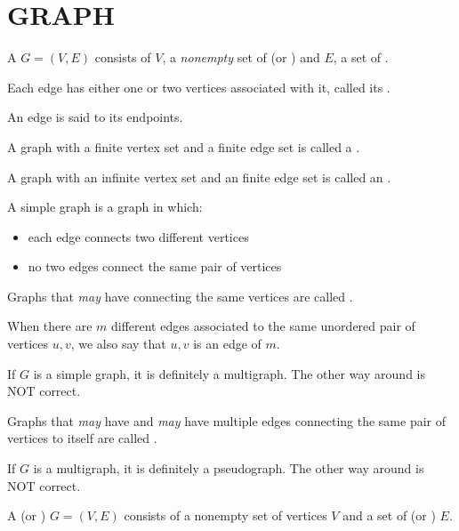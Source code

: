 \chapter{GRAPH}
        \par A  $G = (V, E)$ consists of $V$, a \textit{nonempty} set of
         (or ) and $E$, a set of .
        \par Each edge has either one or two vertices associated with it, called its
        .
        \par An edge is said to  its endpoints.
        \par A graph with a finite vertex set and a finite edge set is called a .
        \par A graph with an infinite vertex set and an finite edge set is called an
        .
        \par A simple graph is a graph in which:
        \begin{itemize}
            \item each edge connects two different vertices
            \item no two edges connect the same pair of vertices
        \end{itemize}
        \par Graphs that \textit{may} have  connecting the same vertices are
        called .
        \par When there are $m$ different edges associated to the same unordered pair of vertices
        ${u, v}$, we also say that ${u, v}$ is an edge of  $m$.
        \par If $G$ is a simple graph, it is definitely a multigraph. The other way around is NOT
        correct.
        \par Graphs that \textit{may} have  and \textit{may} have multiple edges
        connecting the same pair of vertices to itself are called .
        \par If $G$ is a multigraph, it is definitely a pseudograph. The other way around is NOT
        correct.
        \par A  (or ) $G = (V, E)$ consists of a nonempty
        set of vertices $V$ and a set of  (or ) $E$.
